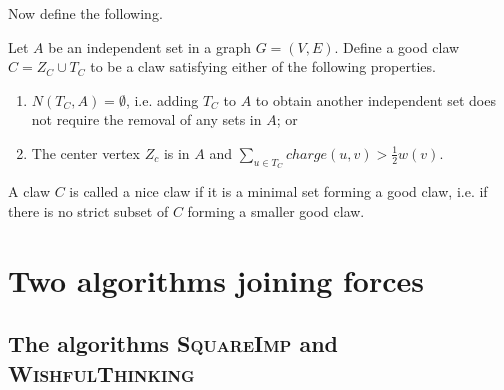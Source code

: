 Now define the following.
%
\begin{defn}
Let $A$ be an independent set in a graph $G = (V,E)$. Define a good claw $C = Z_C \cup T_C$ to be a claw satisfying either of the following properties.
%
\begin{enumerate}
  \item $N(T_C,A) = \emptyset$, i.e. adding $T_C$ to $A$ to obtain another independent set does not require the removal of any sets in $A$; or
  \item The center vertex $Z_c$ is in $A$ and $\sum_{u \in T_C} charge(u,v) > \frac{1}{2}w(v)$.
\end{enumerate}
%
A claw $C$ is called a nice claw if it is a minimal set forming a good claw, i.e. if there is no strict subset of $C$ forming a smaller good claw.
\end{defn}

\section{Two algorithms joining forces}\label{sec:Algorithm}

\subsection{The algorithms \textsc{SquareImp} and \textsc{WishfulThinking}}\label{subsec:Algorithms}

